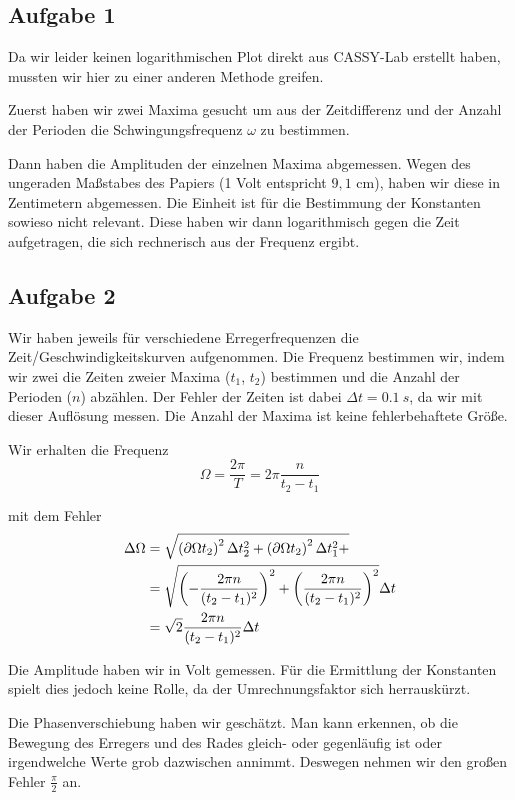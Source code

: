 \documentclass[a4paper,german,12pt,smallheadings]{scrartcl}
\begin{document}
\subsection{Aufgabe 1}
Da wir leider keinen logarithmischen Plot direkt aus CASSY-Lab erstellt haben,
mussten wir hier zu einer anderen Methode greifen.

Zuerst haben wir zwei Maxima gesucht um aus der Zeitdifferenz und der Anzahl
der Perioden die Schwingungsfrequenz $\omega$ zu bestimmen.

Dann haben die Amplituden der einzelnen Maxima abgemessen. Wegen des ungeraden
Maßstabes des Papiers (1 Volt entspricht $9{,}1$ cm), haben wir diese in
Zentimetern abgemessen. Die Einheit ist für die Bestimmung der Konstanten
sowieso nicht relevant. Diese haben wir dann logarithmisch gegen die Zeit
aufgetragen, die sich rechnerisch aus der Frequenz ergibt.


\subsection{Aufgabe 2}
Wir haben jeweils für verschiedene Erregerfrequenzen die
Zeit/Geschwindigkeitskurven aufgenommen. Die Frequenz bestimmen wir, indem wir
zwei die Zeiten zweier Maxima ($t_1$, $t_2$) bestimmen und die Anzahl der
Perioden ($n$) abzählen. Der Fehler der Zeiten ist dabei $\Delta t =
\SI{0.1}{s}$, da wir mit dieser Auflösung messen. Die Anzahl der Maxima ist
keine fehlerbehaftete Größe.

Wir erhalten die Frequenz
\begin{equation}
  \Omega = \frac{2 \pi}{T} = 2 \pi \frac{n}{t_2 - t_1}
\end{equation}

mit dem Fehler
\begin{align}
  \Delta \Omega &= \sqrt{
    \del{\partial{\Omega}{t_2}}^2 \Delta t_2^2 +
    \del{\partial{\Omega}{t_2}}^2 \Delta t_1^2 +
  } \\
  &= \sqrt{
    \del{-\frac{2 \pi n}{(t_2 - t_1)^2}}^2 +
    \del{\frac{2 \pi n}{(t_2 - t_1)^2}}^2
  } \Delta t \\
  &= \sqrt{2} \frac{2 \pi n}{(t_2 - t_1)^2} \Delta t
\end{align}

Die Amplitude haben wir in Volt gemessen. Für die Ermittlung der Konstanten
spielt dies jedoch keine Rolle, da der Umrechnungsfaktor sich herrauskürzt.

Die Phasenverschiebung haben wir geschätzt. Man kann erkennen, ob die Bewegung
des Erregers und des Rades gleich- oder gegenläufig ist oder irgendwelche Werte
grob dazwischen annimmt. Deswegen nehmen wir den großen Fehler $\frac{\pi}{2}$ an.
\end{document}
